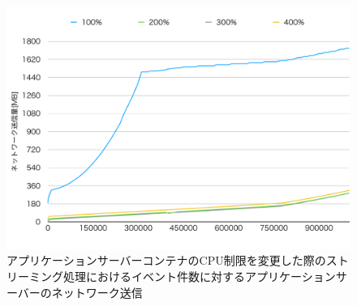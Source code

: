 \documentclass[../../../../../main]{subfiles}
\begin{document}
    \begin{figure}[H]
        \centering
        \includegraphics[width=12cm]{graph}
        \caption{アプリケーションサーバーコンテナのCPU制限を変更した際のストリーミング処理におけるイベント件数に対するアプリケーションサーバーのネットワーク送信}
        \label{fig:stream-change-app-cpu-limit-app-net-out-app_1024-db_1_1024}
    \end{figure}
\end{document}
